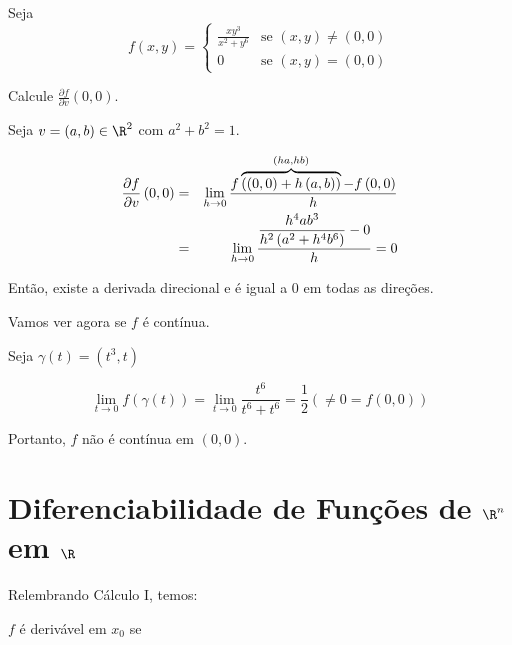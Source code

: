\documentclass{book}
\begin{document}
\begin{ex}
Seja
\begin{equation*}
f(x,y)=\left\{ \begin{array}{cl}\displaystyle
        \frac{{xy^3}}{{x^2  + y^6 }} & \textrm{se }\left( {x,y} \right) \ne \left( {0,0} \right)\\
        0 & \textrm{se }\left( {x,y} \right) = \left( {0,0} \right)\end{array}\right.
\end{equation*}

Calcule $\frac{{\partial f}}{{\partial v}}\left( {0,0} \right)$.
\end{ex}

\begin{sol}
Seja $v = \left( {a,b} \right) \in \R^2$ com $a^2 + b^2 = 1$.

\begin{eqnarray*}\displaystyle
  \frac{{\partial f}}{{\partial v}}\left( {0,0} \right) &=& \mathop {\lim }\limits_{h \to 0} \frac{{f\overbrace {\left( {\left( {0,0} \right) + h\left( {a,b} \right)} \right)}^{\left( {ha,hb} \right)} - f\left( {0,0} \right)}}{h} \hfill \\
   &=& \mathop {\lim }\limits_{h \to 0} \frac{{\displaystyle  \frac{{h^4 ab^3 }}{{h^2 \left( {a^2  + h^4 b^6 } \right)}} - 0}}
{h} = 0 \hfill \\
\end{eqnarray*}

Ent\~ao, existe a derivada direcional e \'e igual a $0$ em todas as dire\c c\~oes.

Vamos ver agora se $f$ \'e cont\'inua.

Seja $\gamma \left( t \right) = \left( {t^3 ,t} \right)$

\[
    \mathop {\lim }\limits_{t \to 0} f\left( {\gamma \left( t \right)} \right) = \mathop {\lim }\limits_{t \to 0} \frac{{t^6 }}{{t^6  + t^6 }} = \frac{1}{2}\left( { \ne 0 = f\left( {0,0} \right)} \right)
\]

Portanto, $f$ n\~ao \'e cont\'inua em $(0,0)$.
\end{sol}

\section{Diferenciabilidade de Fun\c c\~oes de $\R^n$ em $\R$} \label{sec14}

Relembrando C\'alculo I, temos:

$f$ \'e deriv\'avel em $x_0$ se
\end{document}
